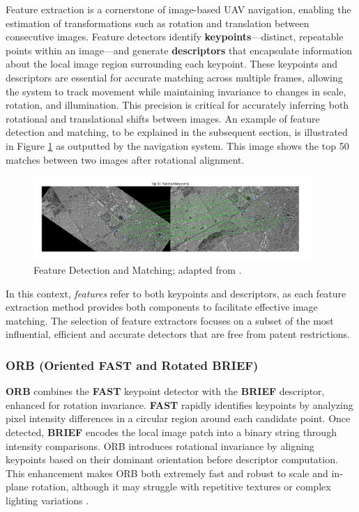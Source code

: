 Feature extraction is a cornerstone of image-based UAV navigation, enabling the estimation of transformations such as rotation and translation between consecutive images. Feature detectors identify \textbf{keypoints}—distinct, repeatable points within an image—and generate \textbf{descriptors} that encapsulate information about the local image region surrounding each keypoint. These keypoints and descriptors are essential for accurate matching across multiple frames, allowing the system to track movement while maintaining invariance to changes in scale, rotation, and illumination. This precision is critical for accurately inferring both rotational and translational shifts between images. An example of feature detection and matching, to be explained in the subsequent section, is illustrated in Figure \ref{fig:feature_detection} as outputted by the navigation system. This image shows the top 50 matches between two images after rotational alignment. 

\begin{figure}[H]
    \centering
    \includegraphics[width=0.94\textwidth]{./Chapter 2/litfigs/matche.png}
    \caption{Feature Detection and Matching; adapted from \cite{GoogleEarth}.}
    \label{fig:feature_detection}
\end{figure}



In this context, \textit{features} refer to both keypoints and descriptors, as each feature extraction method provides both components to facilitate effective image matching. The selection of feature extractors focuses on a subset of the most influential, efficient and accurate detectors that are free from patent restrictions.


\subsubsection{ORB (Oriented FAST and Rotated BRIEF)}

\textbf{ORB} combines the \textbf{FAST} \cite{trajkovic1998fast} keypoint detector with the \textbf{BRIEF} \cite{calonder2010brief} descriptor, enhanced for rotation invariance. \textbf{FAST} rapidly identifies keypoints by analyzing pixel intensity differences in a circular region around each candidate point. Once detected, \textbf{BRIEF} encodes the local image patch into a binary string through intensity comparisons. ORB introduces rotational invariance by aligning keypoints based on their dominant orientation before descriptor computation. This enhancement makes ORB both extremely fast and robust to scale and in-plane rotation, although it may struggle with repetitive textures or complex lighting variations \cite{tareen2018comparative}. 

